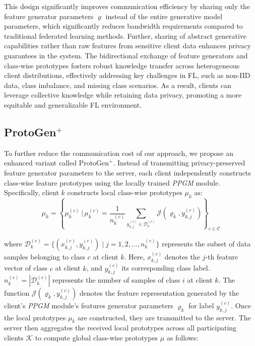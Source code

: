 \documentclass[lettersize,journal]{IEEEtran}
\begin{document}
This design significantly improves communication efficiency by sharing only the feature generator parameters $\varrho$ instead of the entire generative model parameters, which significantly reduces bandwidth requirements compared to traditional federated learning methods. Further, sharing of abstract generative capabilities rather than raw features from sensitive client data enhances privacy guarantees in the system. The bidirectional exchange of feature generators and class-wise prototypes fosters robust knowledge transfer across heterogeneous client distributions, effectively addressing key challenges in FL, such as non-IID data, class imbalance, and missing class scenarios. As a result, clients can leverage collective knowledge while retaining data privacy, promoting a more equitable and generalizable FL environment.

\subsection{\textsf{ProtoGen}$^+$}

To further reduce the communication cost of our approach, we propose an enhanced variant called \textsf{ProtoGen}$^+$. Instead of transmitting privacy-preserved feature generator parameters to the server, each client independently constructs class-wise feature prototypes using the locally trained \emph{PPGM} module.
Specifically, client $k$ constructs local class-wise prototypes $\mu_k$ as:
\begin{equation}
    \label{eq:local_proto}
    \mu_k = \left\{\mu_k^{(c)} \,\big|\, \mu_k^{(c)} = \frac{1}{n_k^{(c)}} \sum_{ y_{k,j}^{(c)}\in \mathcal{D}_k^{(c)}} \mathcal{J}(\varrho_k,  y_{k,j}^{(c)}) \right\}_{c \in \mathcal{C}}
\end{equation}

where $\mathcal{D}_k^{(c)} = \{(x_{k,j}^{(c)}, y_{k,j}^{(c)}) \mid j = 1, 2, \ldots, n_k^{(c)}\}$ represents the subset of data samples belonging to class $c$ at client $k$. Here, $x_{k,j}^{(c)}$ denotes the $j$-th feature vector of class $c$ at client $k$, and $ y_{k,j}^{(c)}$ its corresponding class label. $n_k^{(c)} = |\mathcal{D}_k^{(c)}|$ represents the number of samples of class $i$ at client $k$. The function $\mathcal{J}(\varrho_k, y_{k,j}^{(c)})$ denotes the feature representation generated by the client's \emph{PPGM} module's features generator parameters $\varrho_k$ for label $ y_{k,j}^{(c)}$.
Once the local prototypes $\mu_k$ are constructed, they are transmitted to the server. The server then aggregates the received local prototypes across all participating clients $\mathcal{K}$ to compute global class-wise prototypes $\mu$ as follows:
\end{document}
